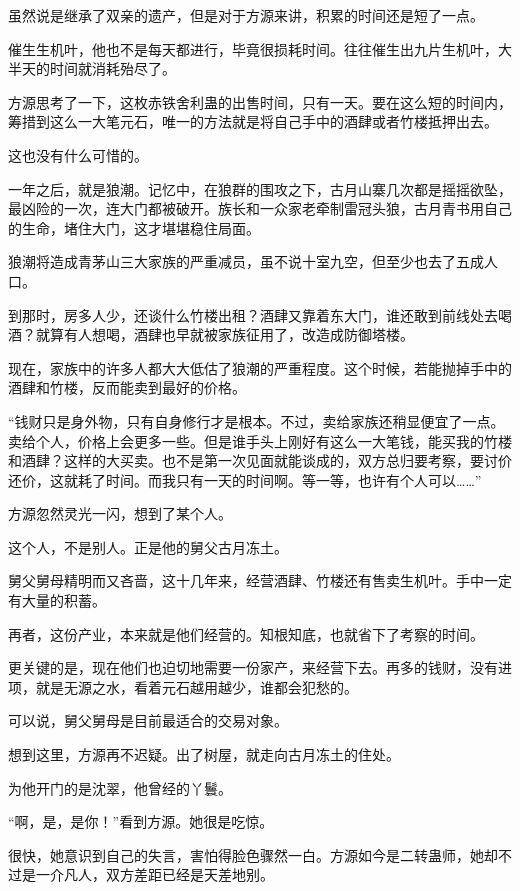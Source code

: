 
\begin{this_body}

虽然说是继承了双亲的遗产，但是对于方源来讲，积累的时间还是短了一点。

催生生机叶，他也不是每天都进行，毕竟很损耗时间。往往催生出九片生机叶，大半天的时间就消耗殆尽了。

方源思考了一下，这枚赤铁舍利蛊的出售时间，只有一天。要在这么短的时间内，筹措到这么一大笔元石，唯一的方法就是将自己手中的酒肆或者竹楼抵押出去。

这也没有什么可惜的。

一年之后，就是狼潮。记忆中，在狼群的围攻之下，古月山寨几次都是摇摇欲坠，最凶险的一次，连大门都被破开。族长和一众家老牵制雷冠头狼，古月青书用自己的生命，堵住大门，这才堪堪稳住局面。

狼潮将造成青茅山三大家族的严重减员，虽不说十室九空，但至少也去了五成人口。

到那时，房多人少，还谈什么竹楼出租？酒肆又靠着东大门，谁还敢到前线处去喝酒？就算有人想喝，酒肆也早就被家族征用了，改造成防御塔楼。

现在，家族中的许多人都大大低估了狼潮的严重程度。这个时候，若能抛掉手中的酒肆和竹楼，反而能卖到最好的价格。

“钱财只是身外物，只有自身修行才是根本。不过，卖给家族还稍显便宜了一点。卖给个人，价格上会更多一些。但是谁手头上刚好有这么一大笔钱，能买我的竹楼和酒肆？这样的大买卖。也不是第一次见面就能谈成的，双方总归要考察，要讨价还价，这就耗了时间。而我只有一天的时间啊。等一等，也许有个人可以……”

方源忽然灵光一闪，想到了某个人。

这个人，不是别人。正是他的舅父古月冻土。

舅父舅母精明而又吝啬，这十几年来，经营酒肆、竹楼还有售卖生机叶。手中一定有大量的积蓄。

再者，这份产业，本来就是他们经营的。知根知底，也就省下了考察的时间。

更关键的是，现在他们也迫切地需要一份家产，来经营下去。再多的钱财，没有进项，就是无源之水，看着元石越用越少，谁都会犯愁的。

可以说，舅父舅母是目前最适合的交易对象。

想到这里，方源再不迟疑。出了树屋，就走向古月冻土的住处。

为他开门的是沈翠，他曾经的丫鬟。

“啊，是，是你！”看到方源。她很是吃惊。

很快，她意识到自己的失言，害怕得脸色骤然一白。方源如今是二转蛊师，她却不过是一介凡人，双方差距已经是天差地别。


\end{this_body}
